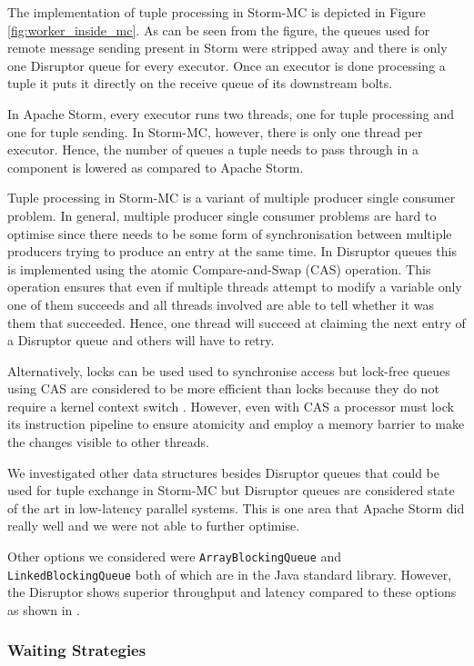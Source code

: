 \documentclass[bsc,logo,frontabs,twoside,singlespacing,normalheadings,parskip]{infthesis}\usepackage[]{graphicx}\usepackage[]{color}
\begin{document}
The implementation of tuple processing in Storm-MC is depicted in Figure \ref{fig:worker_inside_mc}. As can be seen from the figure, the queues used for remote message sending present in Storm were stripped away and there is only one Disruptor queue for every executor. Once an executor is done processing a tuple it puts it directly on the receive queue of its downstream bolts.

In Apache Storm, every executor runs two threads, one for tuple processing and one for tuple sending. In Storm-MC, however, there is only one thread per executor. Hence, the number of queues a tuple needs to pass through in a component is lowered as compared to Apache Storm.

Tuple processing in Storm-MC is a variant of multiple producer single consumer problem. In general, multiple producer single consumer problems are hard to optimise since there needs to be some form of synchronisation between multiple producers trying to produce an entry at the same time. In Disruptor queues this is implemented using the atomic Compare-and-Swap (CAS) operation. This operation ensures that even if multiple threads attempt to modify a variable only one of them succeeds and all threads involved are able to tell whether it was them that succeeded. Hence, one thread will succeed at claiming the next entry of a Disruptor queue and others will have to retry.

Alternatively, locks can be used used to synchronise access but lock-free queues using CAS are considered to be more efficient than locks because they do not require a kernel context switch \cite{Thompson_Farley_Barker_Gee_Stewart_2011}. However, even with CAS a processor must lock its instruction pipeline to ensure atomicity and employ a memory barrier to make the changes visible to other threads.

We investigated other data structures besides Disruptor queues that could be used for tuple exchange in Storm-MC but Disruptor queues are considered state of the art in low-latency parallel systems. This is one area that Apache Storm did really well and we were not able to further optimise.

Other options we considered were \texttt{ArrayBlockingQueue} and \texttt{LinkedBlockingQueue} both of which are in the Java standard library. However, the Disruptor shows superior throughput and latency compared to these options as shown in \citep{DisruptorWiki}.

\subsubsection{Waiting Strategies}
\end{document}
